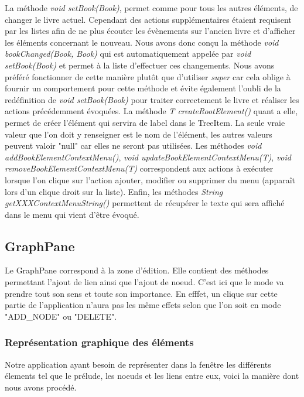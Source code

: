 				La méthode \textit{void setBook(Book)}, permet comme pour tous les autres éléments, de changer le livre actuel. Cependant des actions supplémentaires étaient requisent par les listes afin de ne plus écouter les évènements sur l'ancien livre et d'afficher les éléments concernant le nouveau. Nous avons donc conçu la méthode \textit{void bookChanged(Book, Book)} qui est automatiquement appelée par \textit{void setBook(Book)} et permet à la liste d'effectuer ces changements. Nous avons préféré fonctionner de cette manière plutôt que d'utiliser \textit{super} car cela oblige à fournir un comportement pour cette méthode et évite également l'oubli de la redéfinition de \textit{void setBook(Book)} pour traiter correctement le livre et réaliser les actions précédemment évoquées. La méthode \textit{T createRootElement()} quant a elle, permet de créer l'élément qui servira de label dans le TreeItem. La seule vraie valeur que l'on doit y renseigner est le nom de l'élément, les autres valeurs peuvent valoir "null" car elles ne seront pas utilisées. Les méthodes \textit{void addBookElementContextMenu()}, \textit{void updateBookElementContextMenu(T)}, \textit{void removeBookElementContextMenu(T)} correspondent aux actions à exécuter lorsque l'on clique sur l'action ajouter, modifier ou supprimer du menu (apparaît lors d'un clique droit sur la liste). Enfin, les méthodes \textit{String getXXXContextMenuString()} permettent de récupérer le texte qui sera affiché dans le menu qui vient d'être évoqué.

		\subsection{GraphPane}
			\label{sub:GraphPane}

			Le GraphPane correspond à la zone d'édition. Elle contient des méthodes permettant l'ajout de lien ainsi que l'ajout de noeud. C'est ici que le mode va prendre tout son sens et toute son importance. En efffet, un clique sur cette partie de l'application n'aura pas les même effets selon que l'on soit en mode "ADD\_NODE" ou "DELETE".

			\subsubsection{Représentation graphique des éléments}

				Notre application ayant besoin de représenter dans la fenêtre les différents élements tel que le prélude, les noeuds et les liens entre eux, voici la manière dont nous avons procédé.

